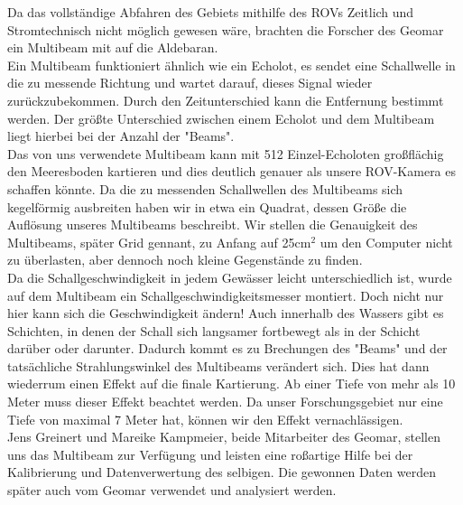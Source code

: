  

Da das vollständige Abfahren des Gebiets mithilfe des ROVs Zeitlich und Stromtechnisch nicht 
möglich gewesen wäre, brachten die Forscher des Geomar ein Multibeam mit auf die Aldebaran. \\

Ein Multibeam funktioniert ähnlich wie ein Echolot, es sendet eine Schallwelle in die zu messende 
Richtung und wartet darauf, dieses Signal wieder zurückzubekommen. Durch den Zeitunterschied 
kann die Entfernung bestimmt werden. Der größte Unterschied zwischen einem Echolot und dem Multibeam 
liegt hierbei bei der Anzahl der "Beams". \\

Das von uns verwendete Multibeam kann mit 512 Einzel-Echoloten großflächig den Meeresboden kartieren und dies 
deutlich genauer als unsere ROV-Kamera es schaffen könnte. Da die zu messenden Schallwellen des Multibeams 
sich kegelförmig ausbreiten haben wir in etwa ein Quadrat, dessen Größe die Auflösung unseres Multibeams beschreibt.
Wir stellen die Genauigkeit des Multibeams, später Grid gennant, zu Anfang auf 25cm$^2$ um den Computer nicht zu überlasten, aber 
dennoch noch kleine Gegenstände zu finden.\\

Da die Schallgeschwindigkeit in jedem Gewässer leicht unterschiedlich ist, wurde auf dem Multibeam
ein Schallgeschwindigkeitsmesser montiert. Doch nicht nur hier kann sich die Geschwindigkeit ändern!
Auch innerhalb des Wassers gibt es Schichten, in denen der Schall sich langsamer fortbewegt als in
der Schicht darüber oder darunter. Dadurch kommt es zu Brechungen des "Beams" und der tatsächliche 
Strahlungswinkel des Multibeams verändert sich. Dies hat dann wiederrum einen Effekt auf die finale Kartierung.
Ab einer Tiefe von mehr als 10 Meter muss dieser Effekt beachtet werden. Da unser Forschungsgebiet nur eine 
Tiefe von maximal 7 Meter hat, können wir den Effekt vernachlässigen.\\

Jens Greinert und Mareike Kampmeier, beide Mitarbeiter des Geomar, stellen uns das Multibeam zur Verfügung und 
leisten eine roßartige Hilfe bei der Kalibrierung und Datenverwertung des selbigen. Die gewonnen Daten werden 
später auch vom Geomar verwendet und analysiert werden. \\

